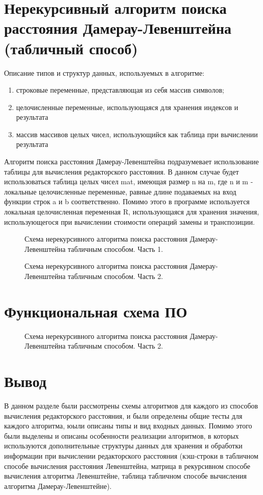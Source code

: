 \section{Нерекурсивный алгоритм поиска расстояния Дамерау-Левенштейна (табличный способ)}

Описание типов и структур данных, используемых в алгоритме:
\begin{enumerate}
	\item строковые переменные, представляющая из себя массив символов;
	\item целочисленные переменные, использующаяся для хранения индексов и результата
	\item массив массивов целых чисел, использующийся как таблица при вычислении результата
\end{enumerate}

Алгоритм поиска расстояния Дамерау-Левенштейна подразумевает использование таблицы для вычисления редакторского расстояния. В данном случае будет использоваться таблица целых чисел mat, имеющая размер n на m, где n и m - локальные целочисленные переменные, равные длине подаваемых на вход функции строк a и b соответственно. Помимо этого в программе используется локальная целочисленная переменная R, использующаяся для хранения значения, использующегося при вычислении стоимости операций замены и транспозиции.

\begin{figure}[ph!]
	\caption{Схема нерекурсивного алгоритма поиска расстояния Дамерау-Левенштейна табличным способом. Часть 1.}
\end{figure}
\newpage
\begin{figure}[ph!]
	\caption{Схема нерекурсивного алгоритма поиска расстояния Дамерау-Левенштейна табличным способом. Часть 2.}
\end{figure}
\newpage
\section{Функциональная схема ПО}
\begin{figure}[ph!]
	\caption{Схема нерекурсивного алгоритма поиска расстояния Дамерау-Левенштейна табличным способом. Часть 2.}
\end{figure}


\section{Вывод}
В данном разделе были рассмотрены схемы алгоритмов для каждого из способов вычисления редакторского расстояния, и были определены общие тесты для каждого алгоритма, юыли описаны типы и вид входных данных. Помимо этого были выделены и описаны особенности реализации алгоритмов, в которых используются дополнительные структуры данных для хранения и обработки информации при вычислении редакторского расстояния (кэш-строки в табличном способе вычисления расстояния Левенштейна, матрица в рекурсивном способе вычисления алгоритма Левенштейне, таблица табличном способе вычисления алгоритма Дамерау-Левенштейне).

